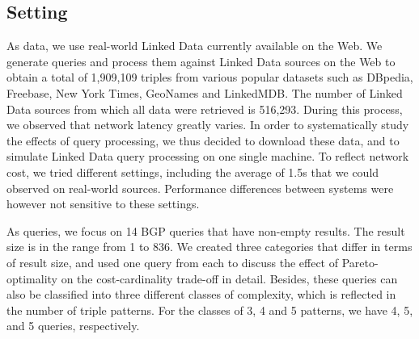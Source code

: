 \subsection{Setting} As data, we use real-world Linked Data currently available on the Web. We generate queries and process them against Linked Data sources on the Web to obtain a total of 1,909,109 triples from various popular datasets such as DBpedia, Freebase, New York Times, GeoNames and LinkedMDB. The number of Linked Data sources from which all data were retrieved is 516,293. During this process, we observed that network latency greatly varies. In order to systematically study the effects of query processing, we thus decided to download these data, and to simulate Linked Data query processing on one single machine. To reflect network cost, we tried different settings, including the average of 1.5s that we could observed on real-world sources. Performance differences between systems were however not sensitive to these settings. 

As queries, we focus on 14 BGP queries that have non-empty results. The result size is in the range from 1 to 836. We created three categories that differ in terms of result size, and used one query from each to discuss the effect of Pareto-optimality on the cost-cardinality trade-off in detail. Besides, these queries can also be classified into three different classes of complexity, which is reflected in the number of triple patterns. For the classes of 3, 4 and 5 patterns, we have 4, 5, and 5 queries, respectively. 






